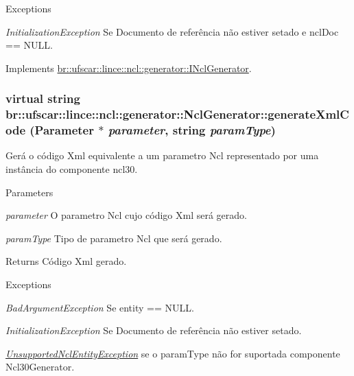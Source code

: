 \begin{DoxyExceptions}{Exceptions}
\item[{\em InitializationException}]Se Documento de referência não estiver setado e nclDoc == NULL. \end{DoxyExceptions}


Implements \hyperlink{classbr_1_1ufscar_1_1lince_1_1ncl_1_1generator_1_1INclGenerator_a9d4259cf5746aec2541681148937057b}{br::ufscar::lince::ncl::generator::INclGenerator}.

\hypertarget{classbr_1_1ufscar_1_1lince_1_1ncl_1_1generator_1_1NclGenerator_a2306a011f81b11d0353644bf6bdf3e2b}{
\subsubsection[{generateXmlCode}]{\setlength{\rightskip}{0pt plus 5cm}virtual string br::ufscar::lince::ncl::generator::NclGenerator::generateXmlCode (Parameter $\ast$ {\em parameter}, \/  string {\em paramType})}}
\label{classbr_1_1ufscar_1_1lince_1_1ncl_1_1generator_1_1NclGenerator_a2306a011f81b11d0353644bf6bdf3e2b}


Gerá o código Xml equivalente a um parametro Ncl representado por uma instância do componente ncl30. 


\begin{DoxyParams}{Parameters}
\item[{\em parameter}]O parametro Ncl cujo código Xml será gerado. \item[{\em paramType}]Tipo de parametro Ncl que será gerado. \end{DoxyParams}
\begin{DoxyReturn}{Returns}
Código Xml gerado. 
\end{DoxyReturn}

\begin{DoxyExceptions}{Exceptions}
\item[{\em BadArgumentException}]Se entity == NULL. \item[{\em InitializationException}]Se Documento de referência não estiver setado. \item[{\em \hyperlink{classbr_1_1ufscar_1_1lince_1_1ncl_1_1generator_1_1UnsupportedNclEntityException}{UnsupportedNclEntityException}}]se o paramType não for suportada componente Ncl30Generator. \end{DoxyExceptions}


